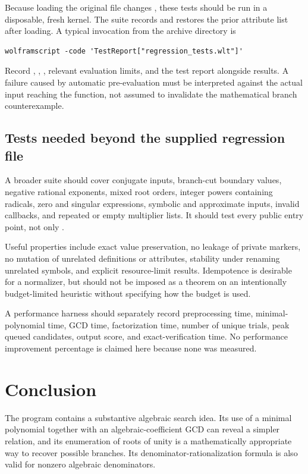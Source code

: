 \documentclass[11pt,letterpaper]{article}
\newcommand{\code}[1]{\texttt{\detokenize{#1}}}
\theoremstyle{definition}
\begin{document}
Because loading the original file changes \code{Print}, these tests should be run
in a disposable, fresh kernel. The suite records and restores the prior attribute
list after loading. A typical invocation from the archive directory is
\begin{lstlisting}[language={}]
wolframscript -code 'TestReport["regression_tests.wlt"]'
\end{lstlisting}
Record \code{$Version}, \code{$SystemID}, \code{$Assumptions}, relevant evaluation
limits, and the test report alongside results. A failure caused by automatic
pre-evaluation must be interpreted against the actual input reaching the function,
not assumed to invalidate the mathematical branch counterexample.

\subsection{Tests needed beyond the supplied regression file}
A broader suite should cover conjugate inputs, branch-cut boundary values,
negative rational exponents, mixed root orders, integer powers containing radicals,
zero and singular expressions, symbolic and approximate inputs, invalid callbacks,
and repeated or empty multiplier lists. It should test every public entry point,
not only \code{denest11}.

Useful properties include exact value preservation, no leakage of private markers,
no mutation of unrelated definitions or attributes, stability under renaming
unrelated symbols, and explicit resource-limit results. Idempotence is desirable
for a normalizer, but should not be imposed as a theorem on an intentionally
budget-limited heuristic without specifying how the budget is used.

A performance harness should separately record preprocessing time, minimal-
polynomial time, GCD time, factorization time, number of unique trials, peak queued
candidates, output score, and exact-verification time. No performance improvement
percentage is claimed here because none was measured.

\section{Conclusion}
The program contains a substantive algebraic search idea. Its use of a minimal
polynomial together with an algebraic-coefficient GCD can reveal a simpler relation,
and its enumeration of roots of unity is a mathematically appropriate way to
recover possible branches. Its denominator-rationalization formula is also valid
for nonzero algebraic denominators.
\end{document}

